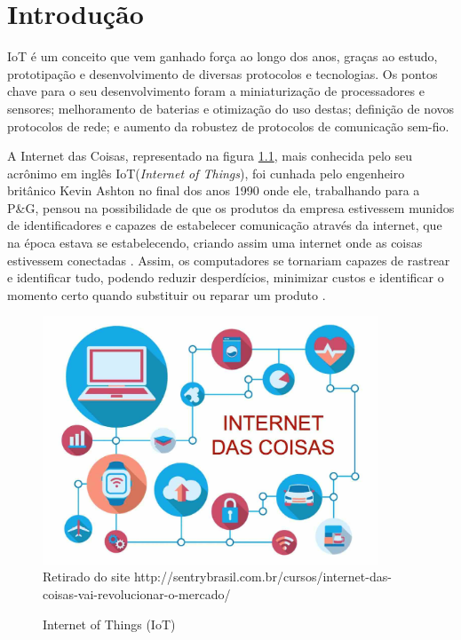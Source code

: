 \chapter[Introdução]{Introdução}
\label{cap:intro}

IoT é um conceito que vem ganhado força ao longo dos anos, graças ao estudo, prototipação e desenvolvimento de diversas protocolos e tecnologias. Os pontos chave para o seu desenvolvimento foram a miniaturização de processadores e sensores; melhoramento de baterias e otimização do uso destas; definição de novos protocolos de rede; e aumento da robustez de protocolos de comunicação sem-fio.

A Internet das Coisas, representado na figura \ref{fig:iotimg}, mais conhecida pelo seu acrônimo em inglês IoT(\textit{Internet of Things}), foi cunhada pelo engenheiro britânico Kevin Ashton no final dos anos 1990 onde ele, trabalhando para a P\&G, pensou na possibilidade de que os produtos da empresa estivessem munidos de identificadores e capazes de estabelecer comunicação através da internet, que na época estava se estabelecendo, criando assim uma internet onde as coisas estivessem conectadas \cite{KA_IOT}. Assim, os computadores se tornariam capazes de rastrear e identificar tudo, podendo reduzir desperdícios, minimizar custos e identificar o momento certo quando substituir ou reparar um produto \cite{lopezIOT}.

\begin{figure}[ht]
    \centering
    \caption{Internet of Things (IoT)}
    \includegraphics[width=10cm]{./sections/textual/chapters/images/intro_iot.jpg}\\
    Retirado do site http://sentrybrasil.com.br/cursos/internet-das-coisas-vai-revolucionar-o-mercado/
    \label{fig:iotimg}
\end{figure}


